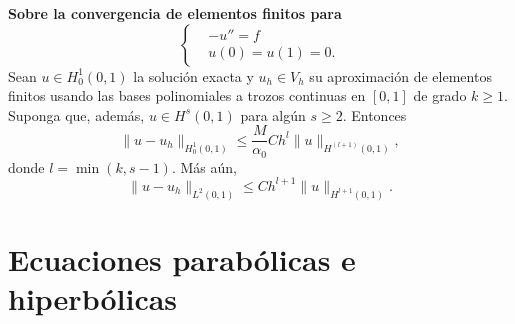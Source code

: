 \documentclass[11pt,letterpaper]{report}
\begin{document}
\textbf{Sobre la convergencia de elementos finitos para}
\begin{equation}
  \left\{
    \begin{aligned}
      & -u'' = f
      \\
      & u(0) = u(1)=0.
    \end{aligned}
  \right.
\end{equation}
Sean $u\in H_{0}^{1}(0,1)$ la solución exacta y $u_h\in V_h$ su
aproximación de elementos finitos usando las bases polinomiales a
trozos continuas en $[0,1]$ de grado $k\geq 1$. Suponga que, además,
$u\in H^{s}(0,1)$ para algún $s\geq 2$. Entonces
\begin{equation}
  \|u-u_h\|_{H^{1}_0(0,1)}
  \leq
  \frac{M}{\alpha_0} Ch^l\|u\|_{H^{(l+1)}(0,1)}
,\end{equation}
donde $l=\min(k,s-1)$. Más aún,
\begin{equation}
  \|u-u_h\|_{L^{2}(0,1)}
  \leq
  Ch^{l+1}\|u\|_{H^{l+1}(0,1)}
.\end{equation}

\section{Ecuaciones parabólicas e hiperbólicas}
\end{document}
